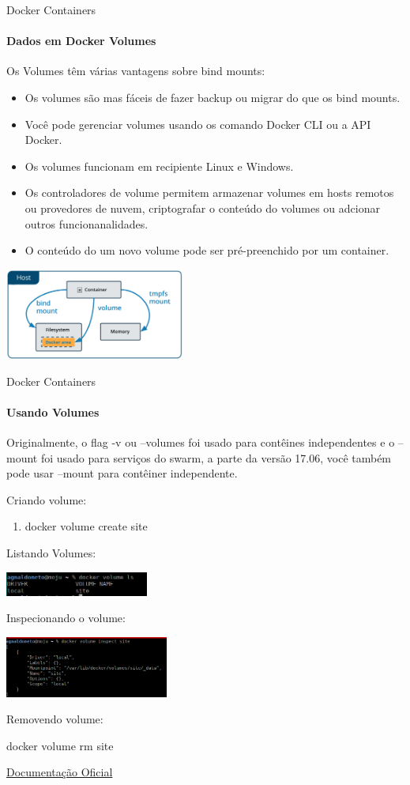 \documentclass{beamer}
\begin{document}
\begin{frame}{Docker Containers}
    \framesubtitle{Dados em Docker Volumes}
    Os Volumes  t\^em v\'arias vantagens sobre bind mounts:
    \begin{itemize}
        \item Os volumes s\~ao mas f\'aceis de fazer backup ou migrar do que os bind mounts.
        \item Voc\^e pode gerenciar volumes usando os comando Docker CLI ou a API Docker.
        \item Os volumes funcionam em recipiente Linux e Windows.
        \item Os controladores de volume permitem armazenar volumes em hosts remotos ou provedores
            de nuvem, criptografar o conte\'udo do volumes ou adcionar outros funcionanalidades.
        \item O conte\'udo do um novo volume pode ser pr\'e-preenchido por um container.
    \end{itemize}
    \includegraphics[height=3cm]{img/types-of-mounts-volume.png}
\end{frame}

\begin{frame}{Docker Containers}
    \framesubtitle{Usando Volumes}
    Originalmente, o flag  -v ou --volumes foi usado para cont\^eines independentes e o --mount foi usado para serviços do swarm, 
    a parte da vers\~ao 17.06, voc\^e tamb\'em pode usar --mount para cont\^einer independente.

    Criando volume:
    \begin{enumerate}
        \item  docker volume create site
    \end{enumerate}

    Listando Volumes:

    \includegraphics[height=0.8cm]{img/volume-ls.png}

    Inspecionando o volume:

    \includegraphics[height=2cm]{img/volume-inspect.png}

    Removendo volume:
    
    docker volume rm site

    \href{https://docs.docker.com/engine/admin/volumes/volumes/}{Documenta\c{c}\~ao Oficial}
\end{frame}
\end{document}
